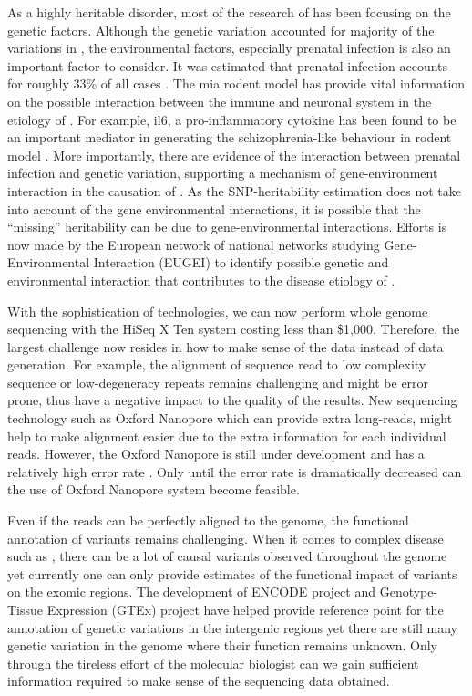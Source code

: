 \documentclass[12pt]{scrbook}
\newcommand*{\glng}{\glsentrylong}
\begin{document}
	As a highly heritable disorder, most of the research of \glng{scz} has been focusing on the genetic factors. 
	Although the genetic variation accounted for majority of the variations in \glng{scz}, the environmental factors, especially prenatal infection is also an important factor to consider. 
	It was estimated that prenatal infection accounts for roughly 33\% of all \glng{scz} cases \citep{Brown2010}.
	The \gls{mia} rodent model has provide vital information on the possible interaction between the immune and neuronal system in the etiology of \glng{scz} \citep{Meyer2007a}.
	For example, \gls{il6}, a pro-inflammatory cytokine has been found to be an important mediator in generating the schizophrenia-like behaviour in rodent model \citep{Smith2007}.
	More importantly, there are evidence of the interaction between prenatal infection and genetic variation, supporting a mechanism of gene-environment interaction in the causation of \glng{scz} \citep{Clarke2009}.
	As the \gls{SNP}-heritability estimation does not take into account of the gene environmental interactions, it is possible that the ``missing'' heritability can be due to gene-environmental interactions. 
	Efforts is now made by the European network of national \glng{scz} networks studying Gene-Environmental Interaction (EUGEI) to identify possible genetic and environmental interaction that contributes to the disease etiology of \glng{scz}.
	
	
	With the sophistication of technologies, we can now perform whole genome sequencing with the HiSeq \RN{10} Ten system costing less than \$1,000. 
	Therefore, the largest challenge now resides in how to make sense of the data instead of data generation.
	For example, the alignment of sequence read to low complexity sequence or low-degeneracy repeats remains challenging and might be error prone, thus have a negative impact to the quality of the results\citep{Sims2014}. 
	New sequencing technology such as Oxford Nanopore which can provide extra long-reads, might help to make alignment easier due to the extra information for each individual reads.
	However, the Oxford Nanopore is still under development and has a relatively high error rate \citep{Mikheyev2014}. 
	Only until the error rate is dramatically decreased can the use of Oxford Nanopore system become feasible. 
	
	Even if the reads can be perfectly aligned to the genome, the functional annotation of variants remains challenging.
	When it comes to complex disease such as \glng{scz}, there can be a lot of causal variants observed throughout the genome yet currently one can only provide estimates of the functional impact of variants on the exomic regions.
	The development of ENCODE project \citep{ENCODEProjectConsortium2012} and Genotype-Tissue Expression (GTEx) project \citep{Consortium2015} have helped provide reference point for the annotation of genetic variations in the intergenic regions yet there are still many genetic variation in the genome where their function remains unknown. 
	Only through the tireless effort of the molecular biologist can we gain sufficient information required to make sense of the sequencing data obtained.	
	
\end{document}
